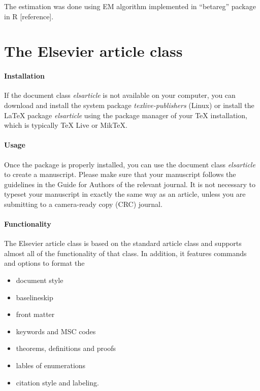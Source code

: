 \documentclass[]{elsarticle} %
\begin{document}
The estimation was done using EM algorithm implemented in ``betareg''
package in R {[}reference{]}.

\hypertarget{the-elsevier-article-class}{%
\section{The Elsevier article class}\label{the-elsevier-article-class}}

\hypertarget{installation}{%
\paragraph{Installation}\label{installation}}

If the document class \emph{elsarticle} is not available on your
computer, you can download and install the system package
\emph{texlive-publishers} (Linux) or install the LaTeX package
\emph{elsarticle} using the package manager of your TeX installation,
which is typically TeX Live or MikTeX.

\hypertarget{usage}{%
\paragraph{Usage}\label{usage}}

Once the package is properly installed, you can use the document class
\emph{elsarticle} to create a manuscript. Please make sure that your
manuscript follows the guidelines in the Guide for Authors of the
relevant journal. It is not necessary to typeset your manuscript in
exactly the same way as an article, unless you are submitting to a
camera-ready copy (CRC) journal.

\hypertarget{functionality}{%
\paragraph{Functionality}\label{functionality}}

The Elsevier article class is based on the standard article class and
supports almost all of the functionality of that class. In addition, it
features commands and options to format the

\begin{itemize}
\item
  document style
\item
  baselineskip
\item
  front matter
\item
  keywords and MSC codes
\item
  theorems, definitions and proofs
\item
  lables of enumerations
\item
  citation style and labeling.
\end{itemize}
\end{document}
